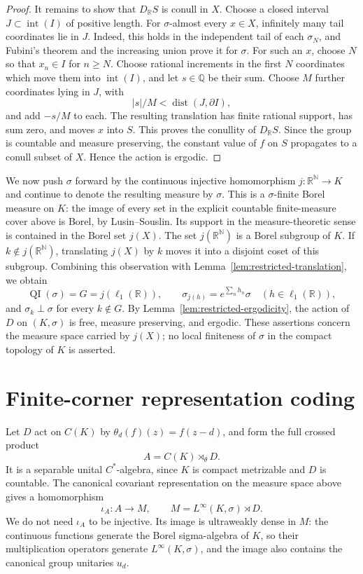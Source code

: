\documentclass[11pt]{article}
\theoremstyle{definition}
\newcommand{\N}{\mathbb N}
\newcommand{\R}{\mathbb R}
\newcommand{\Q}{\mathbb Q}
\newcommand{\QI}{\operatorname{QI}}
\begin{document}
\begin{proof}
It remains to show that $D_{\R}S$ is conull in $X$. Choose a closed
interval $J\subset\operatorname{int}(I)$ of positive length. For
$\sigma$-almost every $x\in X$, infinitely many tail coordinates lie
in $J$. Indeed, this holds in the independent tail of each $\sigma_N$,
and Fubini's theorem and the increasing union prove it for $\sigma$.
For such an $x$, choose $N$ so that $x_n\in I$ for $n\geq N$.
Choose rational increments in the first $N$ coordinates which move them
into $\operatorname{int}(I)$, and let $s\in\Q$ be their sum. Choose
$M$ further coordinates lying in $J$, with
\[
 |s|/M<\operatorname{dist}(J,\partial I),
\]
and add $-s/M$ to each. The resulting translation has finite rational
support, has sum zero, and moves $x$ into $S$. This proves the conullity
of $D_{\R}S$. Since the group is countable and measure preserving, the
constant value of $f$ on $S$ propagates to a conull subset of $X$.
Hence the action is ergodic.
\end{proof}

We now push $\sigma$ forward by the continuous injective homomorphism
$j:\R^{\N}\to K$ and continue to denote the resulting measure by
$\sigma$. This is a $\sigma$-finite Borel measure on $K$: the image of
every set in the explicit countable finite-measure cover above is Borel,
by Lusin--Souslin. Its support in the measure-theoretic sense is contained
in the Borel set $j(X)$. The set $j(\R^{\N})$ is a Borel subgroup of $K$.
If $k\notin j(\R^{\N})$, translating $j(X)$ by $k$ moves it into a
disjoint coset of this subgroup. Combining this observation with
Lemma~\ref{lem:restricted-translation}, we obtain
\begin{equation}
 \QI(\sigma)=G=j(\ell_1(\R)),\qquad
 \sigma_{j(h)}=e^{\sum_n h_n}\sigma\quad(h\in\ell_1(\R)),
 \label{eq:compact-measure-modulus}
\end{equation}
and $\sigma_k\perp\sigma$ for every $k\notin G$. By
Lemma~\ref{lem:restricted-ergodicity}, the action of $D$ on $(K,\sigma)$
is free, measure preserving, and ergodic. These assertions concern the
measure space carried by $j(X)$; no local finiteness of $\sigma$ in the
compact topology of $K$ is asserted.

\section{Finite-corner representation coding}
\label{sec:finite-corner}

Let $D$ act on $C(K)$ by $\theta_d(f)(z)=f(z-d)$, and form the full
crossed product
\[
 A=C(K)\rtimes_\theta D.
\]
It is a separable unital $C^*$-algebra, since $K$ is compact metrizable
and $D$ is countable. The canonical covariant representation on the
measure space above gives a homomorphism
\[
 \iota_A:A\longrightarrow M,
 \qquad M=L^\infty(K,\sigma)\rtimes D.
\]
We do not need $\iota_A$ to be injective. Its image is ultraweakly dense
in $M$: the continuous functions generate the Borel sigma-algebra of
$K$, so their multiplication operators generate $L^\infty(K,\sigma)$,
and the image also contains the canonical group unitaries $u_d$.
\end{document}
